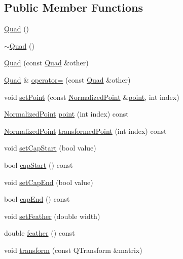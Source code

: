 \subsection*{Public Member Functions}
\begin{DoxyCompactItemize}
\item 
\hyperlink{classOkular_1_1HighlightAnnotation_1_1Quad_a6f71ee70bc49f8150b76a8d2636661db}{Quad} ()
\item 
\hyperlink{classOkular_1_1HighlightAnnotation_1_1Quad_a1c5afe1a4bc551baa56a2dc20cb88b3e}{$\sim$\+Quad} ()
\item 
\hyperlink{classOkular_1_1HighlightAnnotation_1_1Quad_ad82bc11764aef2cf20efac1097a7301d}{Quad} (const \hyperlink{classOkular_1_1HighlightAnnotation_1_1Quad}{Quad} \&other)
\item 
\hyperlink{classOkular_1_1HighlightAnnotation_1_1Quad}{Quad} \& \hyperlink{classOkular_1_1HighlightAnnotation_1_1Quad_a9ba51930c6bab2ef2f6e5c191a307ff8}{operator=} (const \hyperlink{classOkular_1_1HighlightAnnotation_1_1Quad}{Quad} \&other)
\item 
void \hyperlink{classOkular_1_1HighlightAnnotation_1_1Quad_ab9ce9af2562a336d4ef3d75d468c7eed}{set\+Point} (const \hyperlink{classOkular_1_1NormalizedPoint}{Normalized\+Point} \&\hyperlink{classOkular_1_1HighlightAnnotation_1_1Quad_a9c189bc7240228b79d4e848b94fe8e15}{point}, int index)
\item 
\hyperlink{classOkular_1_1NormalizedPoint}{Normalized\+Point} \hyperlink{classOkular_1_1HighlightAnnotation_1_1Quad_a9c189bc7240228b79d4e848b94fe8e15}{point} (int index) const 
\item 
\hyperlink{classOkular_1_1NormalizedPoint}{Normalized\+Point} \hyperlink{classOkular_1_1HighlightAnnotation_1_1Quad_acb6ab9f7ca3003937f7829941f5a0d52}{transformed\+Point} (int index) const 
\item 
void \hyperlink{classOkular_1_1HighlightAnnotation_1_1Quad_af6cd18515ceea4f9523d9c40cf646551}{set\+Cap\+Start} (bool value)
\item 
bool \hyperlink{classOkular_1_1HighlightAnnotation_1_1Quad_acf4eea0c1928c88380831c3d5b3bf90f}{cap\+Start} () const 
\item 
void \hyperlink{classOkular_1_1HighlightAnnotation_1_1Quad_a0dcc70a6b9830a27bd6b6ad5f542992d}{set\+Cap\+End} (bool value)
\item 
bool \hyperlink{classOkular_1_1HighlightAnnotation_1_1Quad_a027de3a1204489adfe5c998602c8bf1b}{cap\+End} () const 
\item 
void \hyperlink{classOkular_1_1HighlightAnnotation_1_1Quad_ada9f47fe278053cf8a680140c7194ec3}{set\+Feather} (double width)
\item 
double \hyperlink{classOkular_1_1HighlightAnnotation_1_1Quad_a959b42d542a5e1e464e46eae2c41c28b}{feather} () const 
\item 
void \hyperlink{classOkular_1_1HighlightAnnotation_1_1Quad_ae0209e81742a659d430d02e3892aa3f6}{transform} (const Q\+Transform \&matrix)
\end{DoxyCompactItemize}


